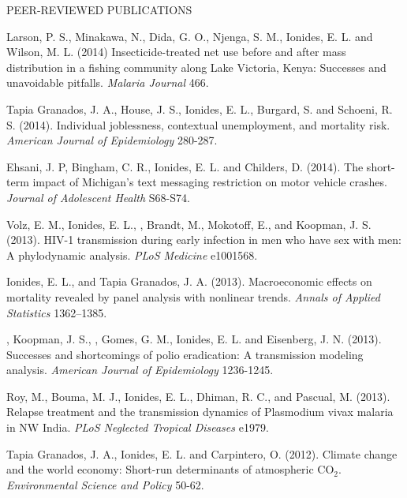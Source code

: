 \begin{reflist}{PEER-REVIEWED PUBLICATIONS}
\item
Larson, P. S., Minakawa,  N., Dida,  G. O., Njenga,  S. M., Ionides,  E. L. and Wilson,  M. L. (2014)
Insecticide-treated net use before and after mass distribution in a fishing community along Lake Victoria, Kenya: Successes and unavoidable pitfalls.
{\em Malaria Journal} {}{\separator}466. 

\item\formal{[[\tapiaPNAS] ]} 
Tapia Granados, J. A.,  House, J. S., Ionides, E. L., Burgard, S. and Schoeni, R. S. (2014). Individual joblessness, contextual unemployment, and mortality risk. {\em American Journal of Epidemiology}  {}{\separator}280-287.

\item\formal{[[\ehsani] ]} 
Ehsani, J. P, Bingham, C. R., Ionides, E. L. and Childers, D. (2014). The short-term impact of Michigan's text messaging restriction on motor vehicle crashes. {\it Journal of Adolescent Health}  {}{\separator}S68-S74.

\item\formal{[[\volz] ] }
Volz, E. M., Ionides, E. L., , Brandt, M., Mokotoff, E., and Koopman, J. S. (2013). HIV-1 transmission during early infection in men who have sex with men: A phylodynamic analysis.
{\em PLoS Medicine} {}{\separator}e1001568.

\item\formal{[[\ionidesAOAS] ] }
Ionides, E. L.,  and Tapia Granados, J. A. 
(2013). 
Macroeconomic effects on mortality revealed by panel analysis with nonlinear trends. {\em Annals of Applied Statistics} {}{\separator}1362–1385.

\item\formal{[[\mayerAJE] ] }
, Koopman, J. S., , Gomes, G. M., Ionides, E. L. and Eisenberg, J. N. (2013). Successes and shortcomings of polio eradication:  A transmission modeling analysis. {\em American Journal of Epidemiology} {}{\separator}1236-1245. 

\item\formal{[[\royPLOSNTD] ] }
Roy, M., Bouma, M. J., Ionides, E. L., Dhiman, R. C., and Pascual, M. 
(2013). Relapse treatment and the transmission dynamics of Plasmodium vivax malaria in NW India. {\em PLoS Neglected Tropical Diseases} {}{\separator}e1979.

\item\formal{[[\tapiaESP] ] }
Tapia Granados, J. A., Ionides, E. L.  and Carpintero, O. (2012). Climate change and the world economy: Short-run determinants of atmospheric $\mathrm{CO}_2$. {\em Environmental Science and Policy} {}{\separator}50-62.


\end{reflist}
